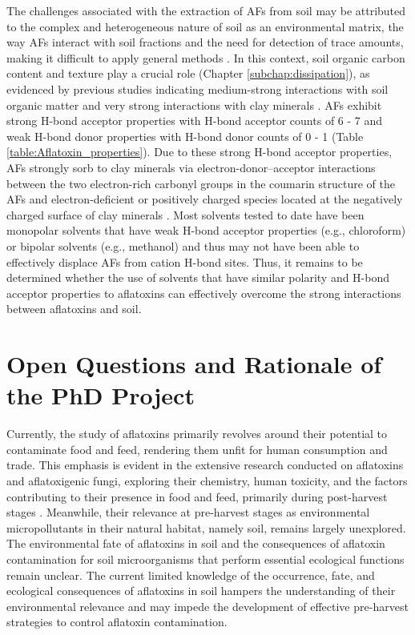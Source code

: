 The challenges associated with the extraction of AFs from soil may be attributed to the complex and heterogeneous nature of soil as an environmental matrix, the way AFs interact with soil fractions and the need for detection of trace amounts, making it difficult to apply general methods \citep{fouche2020aflatoxins}. In this context, soil organic carbon content and texture play a crucial role (Chapter \ref{subchap:dissipation}), as evidenced by previous studies indicating medium-strong interactions with soil organic matter \citep{schenzel2012experimentally, van2006vitro} and very strong interactions with clay minerals \citep{kang2016understanding, goldberg1985aflatoxin}. AFs exhibit strong H-bond acceptor properties with H-bond acceptor counts of 6 - 7 and weak H-bond donor properties with H-bond donor counts of 0 - 1 (Table \ref{table:Aflatoxin_properties}). Due to these strong H-bond acceptor properties, AFs strongly sorb to clay minerals via electron-donor–acceptor interactions between the two electron-rich carbonyl groups in the coumarin structure of the AFs and electron-deficient or positively charged species located at the negatively charged surface of clay minerals \citep{kang2016understanding}. Most solvents tested to date have been monopolar solvents that have weak H-bond acceptor properties (e.g., chloroform) or bipolar solvents (e.g., methanol) and thus may not have been able to effectively displace AFs from cation H-bond sites. Thus, it remains to be determined whether the use of solvents that have similar polarity and H-bond acceptor properties to aflatoxins can effectively overcome the strong interactions between aflatoxins and soil.


\section{Open Questions and Rationale of the PhD Project}

Currently, the study of aflatoxins primarily revolves around their potential to contaminate food and feed, rendering them unfit for human consumption and trade. This emphasis is evident in the extensive research conducted on aflatoxins and aflatoxigenic fungi, exploring their chemistry, human toxicity, and the factors contributing to their presence in food and feed, primarily during post-harvest stages \citep{fouche2020aflatoxins}. Meanwhile, their relevance at pre-harvest stages as environmental micropollutants in their natural habitat, namely soil, remains largely unexplored. The environmental fate of aflatoxins in soil and the consequences of aflatoxin contamination for soil microorganisms that perform essential ecological functions remain unclear. The current limited knowledge of the occurrence, fate, and ecological consequences of aflatoxins in soil hampers the understanding of their environmental relevance and may impede the development of effective pre-harvest strategies to control aflatoxin contamination.


